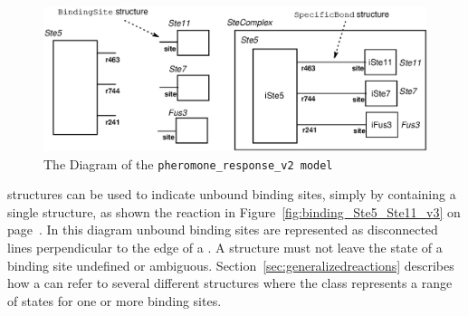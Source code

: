 \documentclass{cekarticle}
\begin{document}
\begin{figure}
  \vspace*{8pt}
  \centering
  \includegraphics[scale = 0.7]{pheromone_response_v2.eps}
  \caption{The Diagram of the \texttt{pheromone\_response\_v2
  model}}
  \label{fig:pheromone_response_v2}
\end{figure}

 structures can be used to indicate unbound
binding sites, simply by containing a single
 structure, as shown the reaction in
Figure~\ref{fig:binding_Ste5_Ste11_v3} on
page~\pageref{fig:binding_Ste5_Ste11_v3}.  In this diagram unbound
binding sites are represented as disconnected lines perpendicular
to the edge of a .  A
 structure must not leave the state of a
binding site undefined or ambiguous.
Section~\ref{sec:generalizedreactions} describes how a
 can refer to several different
 structures where the class represents a range
of states for one or more binding sites.
\end{document}
